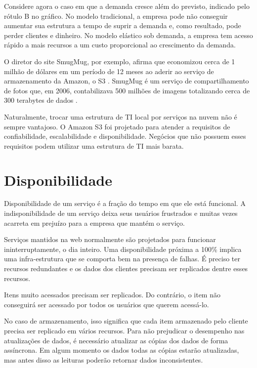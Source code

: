 Considere agora o caso em que a demanda cresce além do previsto, indicado pelo rótulo B no gráfico. No modelo tradicional, a empresa pode não conseguir aumentar sua estrutura a tempo de suprir a demanda e, como resultado, pode perder clientes e dinheiro. No modelo elástico sob demanda, a empresa tem acesso rápido a mais recursos a um custo proporcional ao crescimento da demanda.

O diretor do site SmugMug, por exemplo, afirma que economizou cerca de 1 milhão de dólares em um período de 12 meses ao aderir ao serviço de armazenamento da Amazon, o S3 \cite{http://blogs.smugmug.com/don/2006/11/10/amazon-s3-show-me-the-money/}. SmugMug é um serviço de compartilhamento de fotos que, em 2006, contabilizava 500 milhões de imagens totalizando cerca de 300 terabytes de dados \cite{http://blogs.smugmug.com/don/2006/08/12/amazon-s3-the-holy-grail/}.

Naturalmente, trocar uma estrutura de TI local por serviços na nuvem não é sempre vantajoso. O Amazon S3 foi projetado para atender a requisitos de confiabilidade, escalabilidade e disponibilidade. Negócios que não possuem esses requisitos podem utilizar uma estrutura de TI mais barata.

\section{Disponibilidade}

Disponibilidade de um serviço é a fração do tempo em que ele está funcional. A indisponibilidade de um serviço deixa seus usuários frustrados e muitas vezes acarreta em prejuízo para a empresa que mantém o serviço.

Serviços mantidos na web normalmente são projetados para funcionar ininterruptamente, o dia inteiro. Uma disponibilidade próxima a 100\% implica uma infra-estrutura que se comporta bem na presença de falhas. É preciso ter recursos redundantes e os dados dos clientes precisam ser replicados dentre esses recursos.

Itens muito acessados precisam ser replicados. Do contrário, o item não conseguirá ser acessado por todos os usuários que querem acessá-lo.

No caso de armazenamento, isso significa que cada item armazenado pelo cliente precisa ser replicado em vários recursos. Para não prejudicar o desempenho nas atualizações de dados, é necessário atualizar as cópias dos dados de forma assíncrona. Em algum momento os dados todas as cópias estarão atualizadas, mas antes disso as leituras poderão retornar dados inconsistentes.

